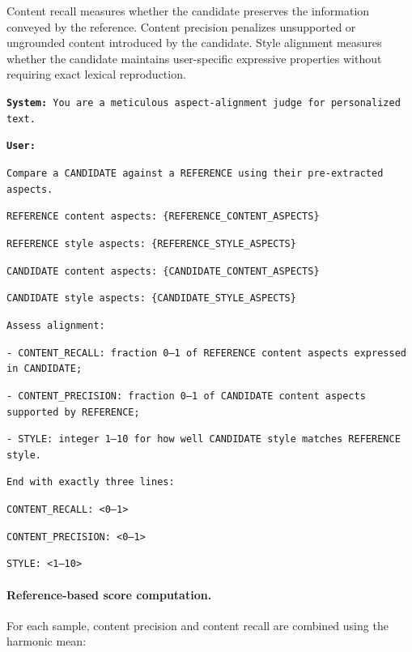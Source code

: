 \documentclass{article} %
\begin{document}
Content recall measures whether the candidate preserves the information conveyed by the reference. Content precision penalizes unsupported or ungrounded content introduced by the candidate. Style alignment measures whether the candidate maintains user-specific expressive properties without requiring exact lexical reproduction.

\begin{tcolorbox}[
    colback=gray!5,
    colframe=black!45,
    title=Aspect matching prompt,
    breakable,
    left=3pt,
    right=3pt,
    top=3pt,
    bottom=3pt
]
\small
\texttt{\textbf{System:} You are a meticulous aspect-alignment judge for personalized text.}

\medskip

\texttt{\textbf{User:}}

\texttt{Compare a CANDIDATE against a REFERENCE using their pre-extracted aspects.}

\medskip

\texttt{REFERENCE content aspects: \{REFERENCE\_CONTENT\_ASPECTS\}}

\texttt{REFERENCE style aspects: \{REFERENCE\_STYLE\_ASPECTS\}}

\medskip

\texttt{CANDIDATE content aspects: \{CANDIDATE\_CONTENT\_ASPECTS\}}

\texttt{CANDIDATE style aspects: \{CANDIDATE\_STYLE\_ASPECTS\}}

\medskip

\texttt{Assess alignment:}

\texttt{- CONTENT\_RECALL: fraction 0--1 of REFERENCE content aspects expressed in CANDIDATE;}

\texttt{- CONTENT\_PRECISION: fraction 0--1 of CANDIDATE content aspects supported by REFERENCE;}

\texttt{- STYLE: integer 1--10 for how well CANDIDATE style matches REFERENCE style.}

\medskip

\texttt{End with exactly three lines:}

\texttt{CONTENT\_RECALL: <0--1>}

\texttt{CONTENT\_PRECISION: <0--1>}

\texttt{STYLE: <1--10>}
\end{tcolorbox}

\paragraph{Reference-based score computation.}
For each sample, content precision and content recall are combined using the harmonic mean:
\end{document}
